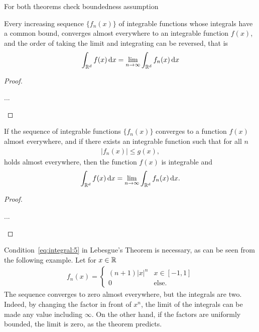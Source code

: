\begin{todo}
  For both theorems check boundedness assumption
\end{todo}

\begin{theorem}
  Every increasing sequence $\{f_n(x)\}$ of integrable functions whose
  integrals have a common bound, converges almost everywhere to an
  integrable function $f(x)$, and the order of taking the limit and
  integrating can be reversed, that is
  \begin{gather}
    \int_{\mathbb R^d} f(x)\,\mathrm{d} x
    = \lim_{n\to\infty} \int_{\mathbb R^d} f_n(x)\,\mathrm{d} x
  \end{gather}
\end{theorem}

\begin{proof}
  \begin{todo}
    ...
  \end{todo}
\end{proof}

\begin{theorem}[Lebesgue]
  If the sequence of integrable functions $\{f_n(x)\}$ converges
  to a function $f(x)$ almost everywhere, and if there exists an
  integrable function such that for all $n$
  \begin{gather}
    \label{eq:integral:5}
    \bigl|f_n(x)\bigr| \le g(x),
  \end{gather}
  holds almost everywhere, then the function $f(x)$ is integrable and
  \begin{gather*}
    \int_{\mathbb R^d} f(x)\,\mathrm{d} x = \lim_{n\to\infty} \int_{\mathbb R^d} f_n(x)\,\mathrm{d} x.
  \end{gather*}
\end{theorem}

\begin{proof}
  \begin{todo}
    ...
  \end{todo}
\end{proof}

\begin{example}
  Condition~\eqref{eq:integral:5} in Lebesgue's Theorem is necessary,
  as can be seen from the following example. Let for $x\in \mathbb R$
  \begin{gather*}
    f_n(x) =
    \begin{cases}
      (n+1) |x|^n & x\in [-1,1] \\
      0 & \text{else}.
    \end{cases}
  \end{gather*}
  The sequence converges to zero almost everywhere, but the integrals
  are two. Indeed, by changing the factor in front of $x^n$, the limit
  of the integrals can be made any value including $\infty$. On the
  other hand, if the factors are uniformly bounded, the limit is zero,
  as the theorem predicts.
\end{example}

